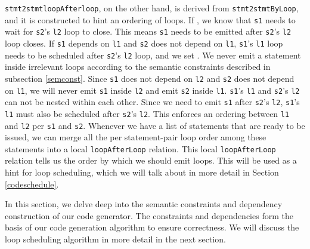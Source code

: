 \documentclass[sigplan, nonacm]{acmart}\settopmatter{printfolios=true,printccs=false,printacmref=false}
\begin{document}
\fi
\texttt{stmt2stmtloopAfterloop}, on the other hand, is derived from \texttt{stmt2stmtByLoop}, and it is constructed to hint an ordering of loops. If , we know that \texttt{s1} needs to wait for \texttt{s2}'s \texttt{l2} loop to close. This means \texttt{s1} needs to be emitted after \texttt{s2}'s \texttt{l2} loop closes. If \texttt{s1} depends on \texttt{l1} and \texttt{s2} does not depend on \texttt{l1}, \texttt{s1}'s \texttt{l1} loop needs to be scheduled after \texttt{s2}'s \texttt{l2} loop, and we set . We never emit a statement inside irrelevant loops according to the semantic constraints described in subsection \ref{semconst}. Since \texttt{s1} does not depend on \texttt{l2} and \texttt{s2} does not depend on \texttt{l1}, we will never emit \texttt{s1} inside \texttt{l2} and emit \texttt{s2} inside \texttt{l1}. \texttt{s1}'s \texttt{l1} and \texttt{s2}'s \texttt{l2} can not be nested within each other. Since we need to emit \texttt{s1} after \texttt{s2}'s \texttt{l2}, \texttt{s1}'s \texttt{l1} must also be scheduled after \texttt{s2}'s \texttt{l2}. This enforces an ordering between \texttt{l1} and \texttt{l2} per \texttt{s1} and \texttt{s2}. Whenever we have a list of statements that are ready to be issued, we can merge all the per statement-pair loop order among these statements into a local \texttt{loopAfterLoop} relation. This local \texttt{loopAfterLoop} relation tells us the order by which we should emit loops. This will be used as a hint for loop scheduling, which we will talk about in more detail in Section \ref{codeschedule}.\par
In this section, we delve deep into the semantic constraints and dependency construction of our code generator. The constraints and dependencies form the basis of our code generation algorithm to ensure correctness. We will discuss the loop scheduling algorithm in more detail in the next section.
\end{document}
